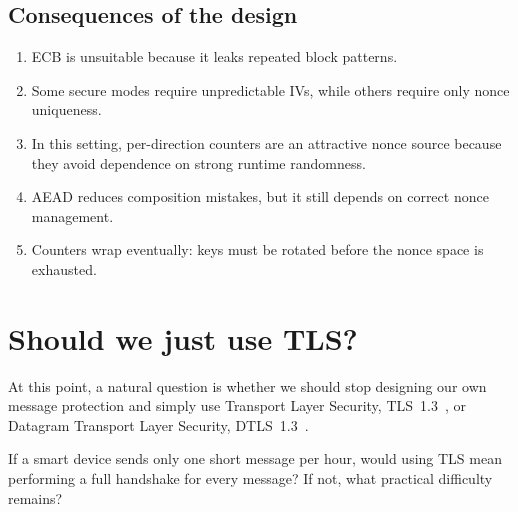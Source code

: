 \subsection{Consequences of the design}

\begin{enumerate}
  \item \ac{ECB} is unsuitable because it leaks repeated block patterns.
  \item Some secure modes require unpredictable IVs, while others require only
    nonce uniqueness.
  \item In this setting, per-direction counters are an attractive nonce source
    because they avoid dependence on strong runtime randomness.
  \item \ac{AEAD} reduces composition mistakes, but it still depends on
    correct nonce management.
  \item Counters wrap eventually: keys must be rotated before the nonce
    space is exhausted.
\end{enumerate}


\section{Should we just use TLS?}
\label{EnergyTLS}


At this point, a natural question is whether we should stop designing our own
message protection and simply use Transport Layer Security,
TLS~1.3~\autocite{RFC8446}, or Datagram Transport Layer Security,
DTLS~1.3~\autocite{RFC9147}.

\begin{exercise}
  If a smart device sends only one short message per hour, would using TLS
  mean performing a full handshake for every message?
  If not, what practical difficulty remains?
\end{exercise}

